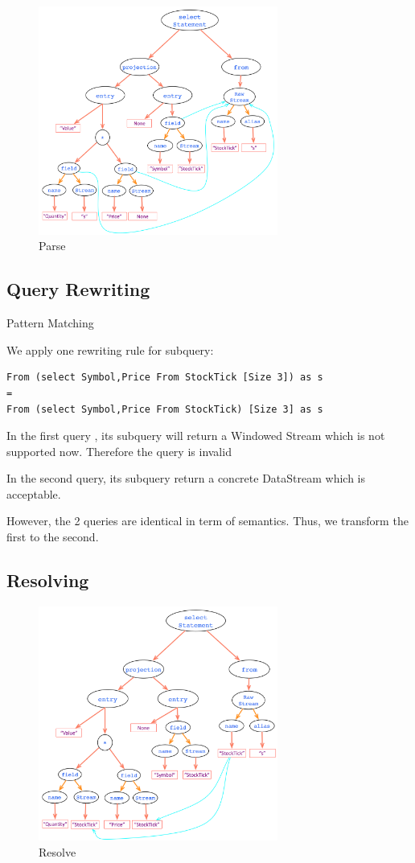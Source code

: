 \begin{figure}[h!] 
\centering    
\includegraphics[width=0.7\textwidth]{Parse}
\caption{Parse}
\label{fig:Parse}
\end{figure}


\subsection{Query Rewriting}
Pattern Matching

We apply one rewriting rule for subquery:
\begin{lstlisting}
From (select Symbol,Price From StockTick [Size 3]) as s
=
From (select Symbol,Price From StockTick) [Size 3] as s
\end{lstlisting}

In the first query , its subquery will return a Windowed Stream which is not supported now. Therefore the query is invalid

In the second query, its subquery return a concrete DataStream which is acceptable.

However, the 2 queries are identical in term of semantics. Thus, we transform the first to the second.


\subsection{Resolving}
\begin{figure}[h!] 
\centering    
\includegraphics[width=0.7\textwidth]{Resolve}
\caption{Resolve}
\label{fig:Resolve}
\end{figure}

